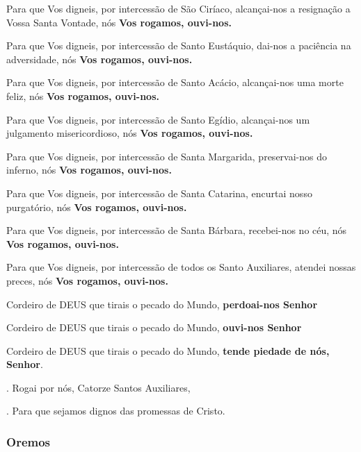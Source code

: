 \documentclass[a4paper,12pt]{extarticle} \usepackage[utf8]{inputenc}
\makeatletter
\newcommand{\vers@resp@sym}{%
  \raisebox{0.2ex}{\rotatebox[origin=c]{-20}{$\m@th\rceil$}}%
}
\newcommand{\vers@resp}[2]{%
  {\ooalign{%
     \hidewidth\kern#1\vers@resp@sym\hidewidth\cr
     #2\cr
  }}%
}
\DeclareRobustCommand{\versicle}{\vers@resp{-0.1em}{V}.  }
\DeclareRobustCommand{\response}{\vers@resp{0pt}{R}.  }
\makeatother
\begin{document}
 

Para que Vos digneis, por intercessão de São Ciríaco, alcançai-nos a resignação a Vossa Santa Vontade, nós \textbf{Vos rogamos, ouvi-nos.}

 

Para que Vos digneis, por intercessão de Santo Eustáquio, dai-nos a paciência na adversidade, nós \textbf{Vos rogamos, ouvi-nos.}

 

Para que Vos digneis, por intercessão de Santo Acácio, alcançai-nos uma morte feliz, nós \textbf{Vos rogamos, ouvi-nos.}

 

Para que Vos digneis, por intercessão de Santo Egídio, alcançai-nos um julgamento misericordioso, nós \textbf{Vos rogamos, ouvi-nos.}

 

Para que Vos digneis, por intercessão de Santa Margarida, preservai-nos do inferno, nós \textbf{Vos rogamos, ouvi-nos.}

 

Para que Vos digneis, por intercessão de Santa Catarina, encurtai nosso purgatório, nós \textbf{Vos rogamos, ouvi-nos.}

 

Para que Vos digneis, por intercessão de Santa Bárbara, recebei-nos no céu, nós \textbf{Vos rogamos, ouvi-nos.}

 

Para que Vos digneis, por intercessão de todos os Santo Auxiliares, atendei nossas preces, nós \textbf{Vos rogamos, ouvi-nos.}

 

Cordeiro de DEUS que tirais o pecado do Mundo,\textbf{ perdoai-nos Senhor}

Cordeiro de DEUS que tirais o pecado do Mundo,\textbf{ ouvi-nos Senhor}

Cordeiro de DEUS que tirais o pecado do Mundo,\textbf{ tende piedade de nós, Senhor}.

\vspace{1cm}

\versicle Rogai por nós, Catorze Santos Auxiliares,

\response Para que sejamos dignos das promessas de Cristo.

 

\subsubsection*{Oremos}
\end{document}
